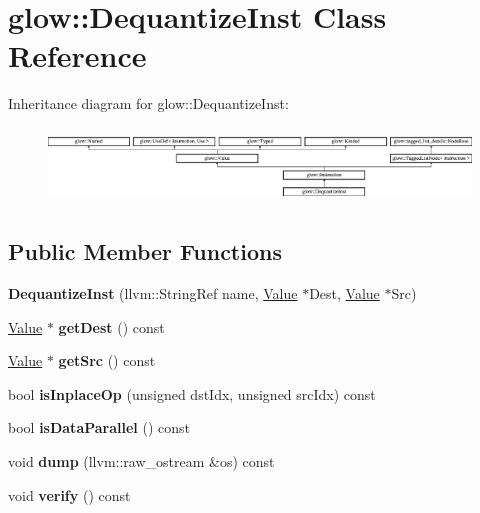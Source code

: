 \hypertarget{classglow_1_1_dequantize_inst}{}\section{glow\+:\+:Dequantize\+Inst Class Reference}
\label{classglow_1_1_dequantize_inst}
Inheritance diagram for glow\+:\+:Dequantize\+Inst\+:\begin{figure}[H]
\begin{center}
\leavevmode
\includegraphics[height=1.991111cm]{classglow_1_1_dequantize_inst}
\end{center}
\end{figure}
\subsection*{Public Member Functions}
\begin{DoxyCompactItemize}
\item 
\mbox{\label{classglow_1_1_dequantize_inst_ae8c1f5d2e1c23068250ecc26ecad7718}} 
{\bfseries Dequantize\+Inst} (llvm\+::\+String\+Ref name, \hyperlink{classglow_1_1_value}{Value} $\ast$Dest, \hyperlink{classglow_1_1_value}{Value} $\ast$Src)
\item 
\mbox{\label{classglow_1_1_dequantize_inst_aa44055c7f4cefc19a12e33ec628d4662}} 
\hyperlink{classglow_1_1_value}{Value} $\ast$ {\bfseries get\+Dest} () const
\item 
\mbox{\label{classglow_1_1_dequantize_inst_a7bd681c1a37f1c2eeab5e17fa7592fcc}} 
\hyperlink{classglow_1_1_value}{Value} $\ast$ {\bfseries get\+Src} () const
\item 
\mbox{\label{classglow_1_1_dequantize_inst_abc332d3cbe2a1206e5f75130f9745ff0}} 
bool {\bfseries is\+Inplace\+Op} (unsigned dst\+Idx, unsigned src\+Idx) const
\item 
\mbox{\label{classglow_1_1_dequantize_inst_aaf9e7b2630d8f441f6313003dab514c8}} 
bool {\bfseries is\+Data\+Parallel} () const
\item 
\mbox{\label{classglow_1_1_dequantize_inst_a7444294e98598f66c8c03ff68add20f6}} 
void {\bfseries dump} (llvm\+::raw\+\_\+ostream \&os) const
\item 
\mbox{\label{classglow_1_1_dequantize_inst_a5606cc271fd534365dee600faa11f0d4}} 
void {\bfseries verify} () const
\end{DoxyCompactItemize}
